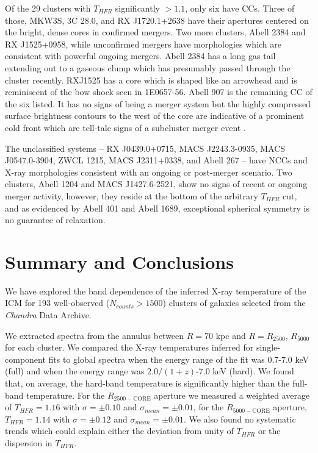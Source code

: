 \documentclass{emulateapj}
\newcommand{\rtwf}{$R_{2500-\text{CORE}}$ }
\newcommand{\rfif}{$R_{5000-\text{CORE}}$ }
\begin{document}
Of the 29 clusters with $T_{HFR}$ significantly $> 1.1$, only six have
CCs. Three of those, MKW3S, 3C 28.0, and RX J1720.1+2638 have their
apertures centered on the bright, dense cores in confirmed
mergers. Two more clusters, Abell 2384 and RX J1525+0958, while
unconfirmed mergers have morphologies which are consistent with
powerful ongoing mergers. Abell 2384 has a long gas tail extending out
to a gaseous clump which has presumably passed through the cluster
recently. RXJ1525 has a core which is shaped like an arrowhead and is
reminiscent of the bow shock seen in 1E0657-56. Abell 907 is the
remaining CC of the six listed. It has no signs of being a merger
system but the highly compressed surface brightness contours to the
west of the core are indicative of a prominent cold front which are
tell-tale signs of a subcluster merger event
\citep{2007PhR...443....1M}.

The unclassified systems -- RX J0439.0+0715, MACS J2243.3-0935, MACS
J0547.0-3904, ZWCL 1215, MACS J2311+0338, and Abell 267 -- have NCCs and
X-ray morphologies consistent with an ongoing or post-merger
scenario. Two clusters, Abell 1204 and MACS J1427.6-2521, show no
signs of recent or ongoing merger activity, however, they reside at
the bottom of the arbitrary $T_{HFR}$ cut, and as evidenced by Abell 401 and
Abell 1689, exceptional spherical symmetry is no guarantee of
relaxation.

\section{Summary and Conclusions}\label{sec:summary}

We have explored the band dependence of the inferred X-ray temperature
of the ICM for 193 well-observed ($N_{counts} > 1500$) clusters of
galaxies selected from the {\it Chandra} Data Archive.

We extracted spectra from the annulus between $R=70$ kpc and
$R=R_{2500}$, $R_{5000}$ for each cluster. We compared the X-ray
temperatures inferred for single-component fits to global spectra
when the energy range of the fit was 0.7-7.0 keV (full) and when the
energy range was $2.0/(1+z)$-7.0 keV (hard). We found that, on
average, the hard-band temperature is significantly higher than
the full-band temperature. For the \rtwf aperture we measured a
weighted average of $T_{HFR} = 1.16$ with $\sigma = \pm 0.10$ and
$\sigma_{mean} = \pm 0.01$, for the \rfif aperture, $T_{HFR} = 1.14$ with
$\sigma = \pm 0.12$ and $\sigma_{mean} = \pm 0.01$. We also found no
systematic trends which could explain either the deviation from unity
of $T_{HFR}$ or the dispersion in $T_{HFR}$.
\end{document}
